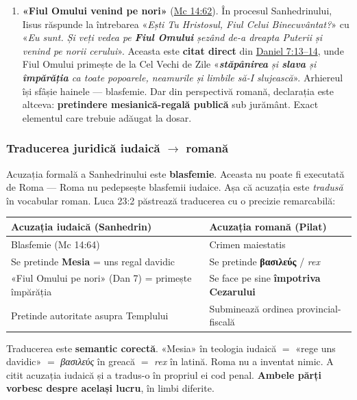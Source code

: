 \documentclass[12pt,a4paper,twoside,openany]{book}
\begin{document}
\begin{enumerate}
  \item \textbf{«Fiul Omului venind pe nori»} (\href{https://bibliaortodoxa.ro/carte.php?id=53\&cap=14\#62}{Mc 14:62}). În procesul Sanhedrinului, Iisus răspunde la întrebarea «\textit{Ești Tu Hristosul, Fiul Celui Binecuvântat?}» cu «\textit{Eu sunt. Și veți vedea pe \textbf{Fiul Omului} șezând de-a dreapta Puterii și venind pe norii cerului}». Aceasta este \textbf{citat direct} din \href{https://bibliaortodoxa.ro/carte.php?id=37\&cap=7\#13}{Daniel 7:13--14}, unde Fiul Omului primește de la Cel Vechi de Zile «\textit{\textbf{stăpânirea} și \textbf{slava} și \textbf{împărăția} ca toate popoarele, neamurile și limbile să-I slujească}». Arhiereul își sfâșie hainele — blasfemie. Dar din perspectivă romană, declarația este altceva: \textbf{pretindere mesianică-regală publică} sub jurământ. Exact elementul care trebuie adăugat la dosar.
\end{enumerate}

\subsubsection*{Traducerea juridică iudaică $\rightarrow$ romană}

Acuzația formală a Sanhedrinului este \textbf{blasfemie}. Aceasta nu poate fi executată de Roma — Roma nu pedepsește blasfemii iudaice. Așa că acuzația este \textit{tradusă} în vocabular roman. Luca 23:2 păstrează traducerea cu o precizie remarcabilă:

\begin{center}
\small
\begin{tabularx}{\textwidth}{L{5cm}X}
\toprule
{}
\textbf{Acuzația iudaică (Sanhedrin)} & \textbf{Acuzația romană (Pilat)} \\
\midrule
Blasfemie (Mc 14:64) & Crimen maiestatis \\
Se pretinde \textbf{Mesia} = uns regal davidic & Se pretinde \textbf{βασιλεύς} / \textit{rex} \\
«Fiul Omului pe nori» (Dan 7) = primește împărăția & Se face pe sine \textbf{împotriva Cezarului} \\
Pretinde autoritate asupra Templului & Subminează ordinea provincial-fiscală \\
\bottomrule
\end{tabularx}
\end{center}

Traducerea este \textbf{semantic corectă}. «Mesia» în teologia iudaică $=$ «rege uns davidic» $=$ \textit{βασιλεύς} în greacă $=$ \textit{rex} în latină. Roma nu a inventat nimic. A citit acuzația iudaică și a tradus-o în propriul ei cod penal. \textbf{Ambele părți vorbesc despre același lucru}, în limbi diferite.
\end{document}
